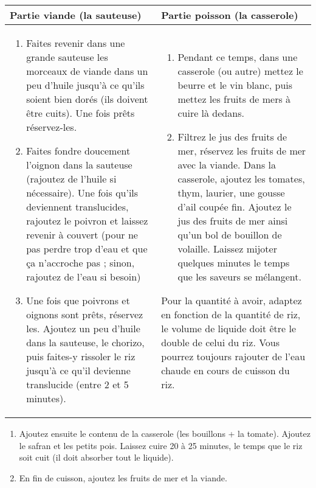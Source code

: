 \begin{tabular}{p{}|p{}}
Partie viande (la sauteuse)& Partie poisson (la casserole)\\\hline
\begin{enumerate}
\item Faites revenir dans une grande sauteuse les morceaux de viande dans un peu d'huile jusqu'à ce qu'ils soient bien dorés (ils doivent être cuits). Une fois prêts réservez-les.
\item Faites fondre doucement l'oignon dans la sauteuse (rajoutez de l'huile si nécessaire). Une fois qu'ils deviennent translucides, rajoutez le poivron et laissez revenir à couvert (pour ne pas perdre trop d'eau et que ça n'accroche pas ; sinon, rajoutez de l'eau si besoin)
\item Une fois que poivrons et oignons sont prêts, réservez les. Ajoutez un peu d'huile dans la sauteuse, le chorizo, puis faites-y rissoler le riz jusqu'à ce qu'il devienne translucide (entre 2 et 5 minutes).
\end{enumerate}&\begin{enumerate}
\item Pendant ce temps, dans une casserole (ou autre) mettez le beurre et le vin blanc, puis mettez les fruits de mers à cuire là dedans\footnotemark.
\item Filtrez le jus des fruits de mer, réservez les fruits de mer avec la viande. Dans la casserole, ajoutez les tomates, thym, laurier, une gousse d'ail coupée fin. Ajoutez le jus des fruits de mer ainsi qu'un bol de bouillon de volaille. Laissez mijoter quelques minutes le temps que les saveurs se mélangent.
\end{enumerate}
\begin{remarque}
Pour la quantité à avoir, adaptez en fonction de la quantité de riz, le volume de liquide doit être le double de celui du riz. Vous pourrez toujours rajouter de l'eau chaude en cours de cuisson du riz.
\end{remarque}
\end{tabular}
\begin{enumerate}
\item Ajoutez ensuite le contenu de la casserole (les bouillons + la tomate). Ajoutez le safran et les petits pois. Laissez cuire 20 à 25 minutes, le temps que le riz soit cuit (il doit absorber tout le liquide).
\item En fin de cuisson, ajoutez les fruits de mer et la viande.
\end{enumerate}



